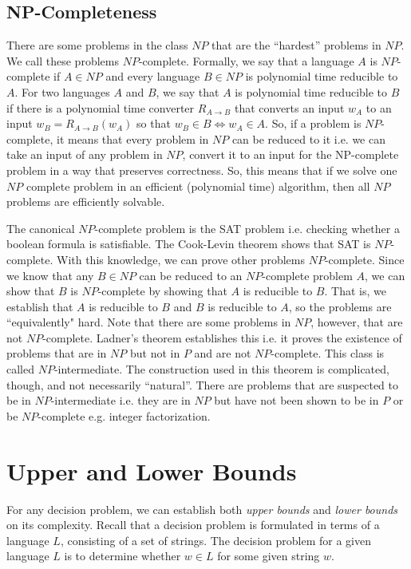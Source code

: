 \documentclass[10pt,a4paper]{article}
\begin{document}
\subsection*{NP-Completeness}

There are some problems in the class $NP$ that are the ``hardest'' problems in $NP$. We call these problems $NP$-complete. Formally, we say that a language $A$ is $NP$-complete if $A \in NP$ and every language $B \in NP$ is polynomial time reducible to $A$. For two languages $A$ and $B$, we say that $A$ is polynomial time reducible to $B$ if there is a polynomial time converter $R_{A\rightarrow B}$ that converts an input $w_A$ to an input $w_B = R_{A\rightarrow B}(w_A)$ so that $w_B \in B \iff w_A \in A$. So, if a problem is $NP$-complete, it means that every problem in $NP$ can be reduced to it i.e. we can take an input of any problem in $NP$, convert it to an input for the NP-complete problem in a way that preserves correctness. So, this means that if we solve one $NP$ complete problem in an efficient (polynomial time) algorithm, then all $NP$ problems are efficiently solvable. 

The canonical $NP$-complete problem is the SAT problem i.e. checking whether a boolean formula is satisfiable. The Cook-Levin theorem shows that SAT is $NP$-complete. With this knowledge, we can prove other problems $NP$-complete. Since we know that any $B \in NP$ can be reduced to an $NP$-complete problem $A$, we can show that $B$ is $NP$-complete by showing that $A$ is reducible to $B$. That is, we establish that $A$ is reducible to $B$ and $B$ is reducible to $A$, so the problems are ``equivalently" hard. Note that there are some problems in $NP$, however, that are not $NP$-complete. Ladner's theorem establishes this i.e. it proves the existence of problems that are in $NP$ but not in $P$ and are not $NP$-complete. This class is called $NP$-intermediate. The construction used in this theorem is complicated, though, and not necessarily ``natural''. There are problems that are suspected to be in $NP$-intermediate i.e. they are in $NP$ but have not been shown to be in $P$ or be $NP$-complete e.g. integer factorization.



\section{Upper and Lower Bounds}
For any decision problem, we can establish both \textit{upper bounds} and \textit{lower bounds} on its complexity. Recall that a decision problem is formulated in terms of a language $L$, consisting of a set of strings. The decision problem for a given language $L$ is to determine whether $w \in L$ for some given string $w$.
\end{document}
